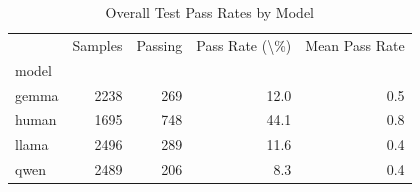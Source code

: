 \begin{table}[htbp]
\caption{Overall Test Pass Rates by Model}
\label{tab:overall_pass}
\begin{tabular}{lrrrr}
\toprule
 & Samples & Passing & Pass Rate (\textbackslash \%) & Mean Pass Rate \\
model &  &  &  &  \\
\midrule
gemma & 2238 & 269 & 12.0 & 0.5 \\
human & 1695 & 748 & 44.1 & 0.8 \\
llama & 2496 & 289 & 11.6 & 0.4 \\
qwen & 2489 & 206 & 8.3 & 0.4 \\
\bottomrule
\end{tabular}
\end{table}
